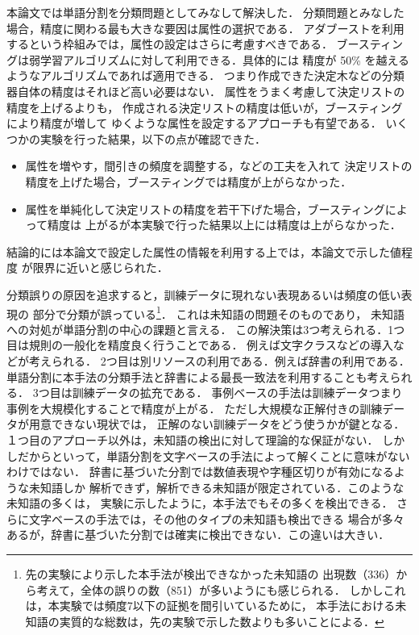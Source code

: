 本論文では単語分割を分類問題としてみなして解決した．
分類問題とみなした場合，精度に関わる最も大きな要因は属性の選択である．
アダブーストを利用するという枠組みでは，属性の設定はさらに考慮すべきである．
ブースティングは弱学習アルゴリズムに対して利用できる．具体的には
精度が 50\% を越えるようなアルゴリズムであれば適用できる．
つまり作成できた決定木などの分類器自体の精度はそれほど高い必要はない．
属性をうまく考慮して決定リストの精度を上げるよりも，
作成される決定リストの精度は低いが，ブースティングにより精度が増して
ゆくような属性を設定するアプローチも有望である．
いくつかの実験を行った結果，以下の点が確認できた．
\begin{itemize}
\item 属性を増やす，間引きの頻度を調整する，などの工夫を入れて
決定リストの精度を上げた場合，ブースティングでは精度が上がらなかった．
\item 属性を単純化して決定リストの精度を若干下げた場合，ブースティングによって精度は
上がるが本実験で行った結果以上には精度は上がらなかった．
\end{itemize}
\noindent
結論的には本論文で設定した属性の情報を利用する上では，本論文で示した値程度
が限界に近いと感じられた．

分類誤りの原因を追求すると，訓練データに現れない表現あるいは頻度の低い表現の
部分で分類が誤っている\footnote{先の実験により示した本手法が検出できなかった未知語の
出現数（336）から考えて，全体の誤りの数（851）が多いようにも感じられる．
しかしこれは，本実験では頻度7以下の証拠を間引いているために，
本手法における未知語の実質的な総数は，先の実験で示した数よりも多いことによる．}．
これは未知語の問題そのものであり，
未知語への対処が単語分割の中心の課題と言える．
この解決策は3つ考えられる．1つ目は規則の一般化を精度良く行うことである．
例えば文字クラス\cite{oda99}などの導入などが考えられる．
2つ目は別リソースの利用である．例えば辞書の利用である．
単語分割に本手法の分類手法と辞書による最長一致法を利用することも考えられる．
3つ目は訓練データの拡充である．
事例ベースの手法\cite{yamashita98,ito99}は訓練データつまり事例を大規模化することで精度が上がる．
ただし大規模な正解付きの訓練データが用意できない現状では，
正解のない訓練データをどう使うかが鍵となる\cite{shinno00}．
１つ目のアプローチ以外は，未知語の検出に対して理論的な保証がない．
しかしだからといって，単語分割を文字ベースの手法によって解くことに意味がないわけではない．
辞書に基づいた分割では数値表現や字種区切りが有効になるような未知語しか
解析できず，解析できる未知語が限定されている．このような未知語の多くは，
実験に示したように，本手法でもその多くを検出できる．
さらに文字ベースの手法では，その他のタイプの未知語も検出できる
場合が多々あるが，辞書に基づいた分割では確実に検出できない．この違いは大きい．

